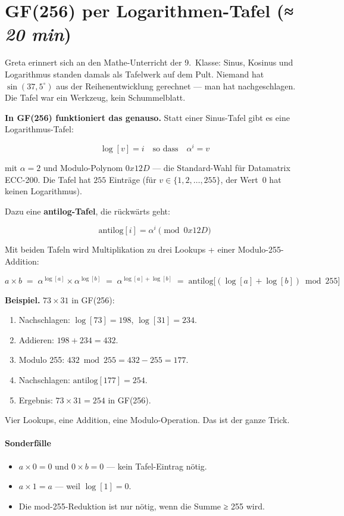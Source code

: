 \section{GF(256) per Logarithmen-Tafel
         \normalfont(\textit{≈ 20 min})}

Greta erinnert sich an den Mathe-Unterricht der 9.~Klasse: Sinus,
Kosinus und Logarithmus standen damals als Tafelwerk auf dem Pult.
Niemand hat $\sin(37{,}5^\circ)$ aus der Reihenentwicklung gerechnet —
man hat nachgeschlagen. Die Tafel war ein Werkzeug, kein Schummelblatt.

\textbf{In GF(256) funktioniert das genauso.} Statt einer
Sinus-Tafel gibt es eine Logarithmus-Tafel:

\[
  \log[v] = i \quad\text{so dass}\quad \alpha^i = v
\]

mit $\alpha = 2$ und Modulo-Polynom $0x12D$ — die Standard-Wahl
für Datamatrix ECC-200. Die Tafel hat $255$ Einträge (für
$v \in \{1, 2, \dots, 255\}$, der Wert~0 hat keinen Logarithmus).

Dazu eine \textbf{antilog-Tafel}, die rückwärts geht:

\[
  \text{antilog}[i] = \alpha^i \pmod{0x12D}
\]

Mit beiden Tafeln wird Multiplikation zu drei Lookups + einer
Modulo-255-Addition:

\[
  a \times b \;=\; \alpha^{\log[a]} \times \alpha^{\log[b]}
                \;=\; \alpha^{\log[a] + \log[b]}
                \;=\; \text{antilog}\!\big[(\log[a] + \log[b]) \bmod 255\big]
\]

\textbf{Beispiel.} $73 \times 31$ in GF(256):

\begin{enumerate}
\item Nachschlagen: $\log[73] = 198$, $\log[31] = 234$.
\item Addieren: $198 + 234 = 432$.
\item Modulo 255: $432 \bmod 255 = 432 - 255 = 177$.
\item Nachschlagen: $\text{antilog}[177] = 254$.
\item Ergebnis: $73 \times 31 = 254$ in GF(256).
\end{enumerate}

Vier Lookups, eine Addition, eine Modulo-Operation. Das ist der ganze Trick.

\paragraph{Sonderfälle}
\begin{itemize}
\item $a \times 0 = 0$ und $0 \times b = 0$ — kein Tafel-Eintrag nötig.
\item $a \times 1 = a$ — weil $\log[1] = 0$.
\item Die mod-255-Reduktion ist nur nötig, wenn die Summe ≥ 255 wird.
\end{itemize}

